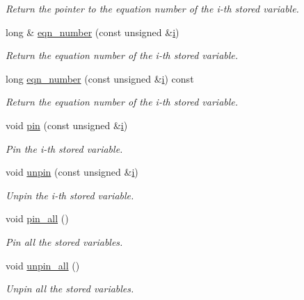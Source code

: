 \begin{DoxyCompactItemize}
\begin{DoxyCompactList}\small\item\em Return the pointer to the equation number of the i-\/th stored variable. \end{DoxyCompactList}\item 
long \& \hyperlink{classoomph_1_1Data_a13206dcb7a088db0ef845ab71af505d2}{eqn\+\_\+number} (const unsigned \&\hyperlink{cfortran_8h_adb50e893b86b3e55e751a42eab3cba82}{i})
\begin{DoxyCompactList}\small\item\em Return the equation number of the i-\/th stored variable. \end{DoxyCompactList}\item 
long \hyperlink{classoomph_1_1Data_a0181614ab39e3b02d28acba40bb33cb2}{eqn\+\_\+number} (const unsigned \&\hyperlink{cfortran_8h_adb50e893b86b3e55e751a42eab3cba82}{i}) const
\begin{DoxyCompactList}\small\item\em Return the equation number of the i-\/th stored variable. \end{DoxyCompactList}\item 
void \hyperlink{classoomph_1_1Data_a422231c58e423f0b43822827aa334d79}{pin} (const unsigned \&\hyperlink{cfortran_8h_adb50e893b86b3e55e751a42eab3cba82}{i})
\begin{DoxyCompactList}\small\item\em Pin the i-\/th stored variable. \end{DoxyCompactList}\item 
void \hyperlink{classoomph_1_1Data_a4e5cb031bf8eceb8f97c2c4fbd74cb05}{unpin} (const unsigned \&\hyperlink{cfortran_8h_adb50e893b86b3e55e751a42eab3cba82}{i})
\begin{DoxyCompactList}\small\item\em Unpin the i-\/th stored variable. \end{DoxyCompactList}\item 
void \hyperlink{classoomph_1_1Data_a16277ea5b41cd9b09739b21a379d7eb4}{pin\+\_\+all} ()
\begin{DoxyCompactList}\small\item\em Pin all the stored variables. \end{DoxyCompactList}\item 
void \hyperlink{classoomph_1_1Data_a590a3262e33167e464bb5d34c90a88ef}{unpin\+\_\+all} ()
\begin{DoxyCompactList}\small\item\em Unpin all the stored variables. \end{DoxyCompactList}\item 

\end{DoxyCompactItemize}
